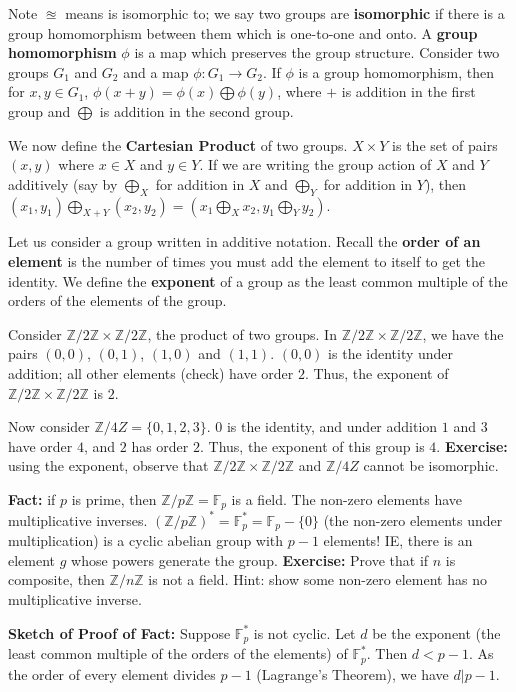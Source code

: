 \documentclass[12pt,letterpaper]{report}
\newcommand{\Z}{\ensuremath{\mathbb{Z}}}
\newcommand{\F}{\mathbb{F}}
\newcommand{\Fp}{ \F_p }
\newcommand{\Fpf}{ \Fp^{*} }
\newcommand{\ZnZ}{ \Z / n\Z}
\begin{document}
Note $\approxeq$ means is isomorphic to; we say two groups are
\textbf{isomorphic} if there is a group homomorphism between them
which is one-to-one and onto. A \textbf{group homomorphism} $\phi$
is a map which preserves the group structure. Consider two groups
$G_1$ and $G_2$ and a map $\phi: G_1 \rightarrow G_2$. If $\phi$
is a group homomorphism, then for $x, y \in G_1$, $\phi(x+y) =
\phi(x) \bigoplus \phi(y)$, where $+$ is addition in the first
group and $\bigoplus$ is addition in the second group.

We now define the \textbf{Cartesian Product} of two groups. $X
\times Y$ is the set of pairs $(x,y)$ where $x \in X$ and $y \in
Y$. If we are writing the group action of $X$ and $Y$ additively
(say by $\bigoplus_X$ for addition in $X$ and $\bigoplus_Y$ for
addition in $Y$), then  $(x_1,y_1) \bigoplus_{X+Y} (x_2,y_2) =
(x_1 \bigoplus_X x_2, y_1 \bigoplus_Y y_2)$.

Let us consider a group written in additive notation. Recall the
\textbf{order of an element} is the number of times you must add
the element to itself to get the identity. We define the
\textbf{exponent} of a group as the least common multiple of the
orders of the elements of the group.

Consider $\Z / 2\Z \times \Z / 2\Z$, the product of two groups. In
$\Z / 2\Z \times \Z / 2\Z$, we have the pairs $(0,0)$, $(0,1)$,
$(1,0)$ and $(1,1)$. $(0,0)$ is the identity under addition; all
other elements (check) have order $2$. Thus, the exponent of $\Z /
2\Z \times \Z / 2\Z$ is $2$.

Now consider $\Z / 4Z = \{0,1,2,3\}$. $0$ is the identity, and
under addition $1$ and $3$ have order $4$, and $2$ has order $2$.
Thus, the exponent of this group is $4$. \textbf{Exercise:} using
the exponent, observe that $\Z / 2\Z \times \Z / 2\Z$ and $\Z /
4Z$ cannot be isomorphic.

\textbf{Fact:} if $p$ is prime, then $\Z / p\Z = \Fp$ is a field.
The non-zero elements have multiplicative inverses. $(\Z /
p\Z)^{*} = \Fp^{*} = \Fp - \{0\}$ (the non-zero elements under
multiplication) is a cyclic abelian group with $p-1$ elements! IE,
there is an element $g$ whose powers generate the group.
\textbf{Exercise:} Prove that if $n$ is composite, then $\ZnZ$ is
not a field. Hint: show some non-zero element has no
multiplicative inverse.

\textbf{Sketch of Proof of Fact:} Suppose $\Fpf$ is not cyclic.
Let $d$ be the exponent (the least common multiple of the orders
of the elements) of $\Fpf$. Then $d < p-1$. As the order of every
element divides $p-1$ (Lagrange's Theorem), we have $d|p-1$.
\end{document}
